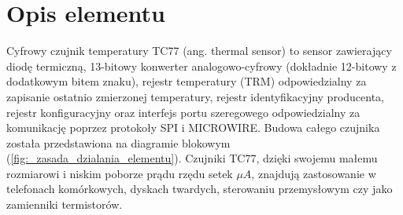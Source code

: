 \documentclass[11pt, a4paper]{article}
\author{Jakub Grzesiak}
\begin{document}
%
%
\newpage

\section*{Opis elementu}
Cyfrowy czujnik temperatury TC77 (ang. thermal sensor) to sensor zawierający diodę termiczną, 13-bitowy konwerter analogowo-cyfrowy (dokładnie 12-bitowy z dodatkowym bitem znaku), rejestr temperatury (TRM) odpowiedzialny za zapisanie ostatnio zmierzonej temperatury, rejestr identyfikacyjny producenta, rejestr konfiguracyjny oraz interfejs portu szeregowego odpowiedzialny za komunikację poprzez protokoły SPI i MICROWIRE. Budowa całego czujnika została przedstawiona na diagramie blokowym (\ref{fig:_zasada_dzialania_elementu}). Czujniki TC77, dzięki swojemu małemu rozmiarowi i niskim poborze prądu rzędu setek $\mu A$, znajdują zastosowanie w telefonach komórkowych, dyskach twardych, sterowaniu przemysłowym czy jako zamienniki termistorów.
\end{document}
